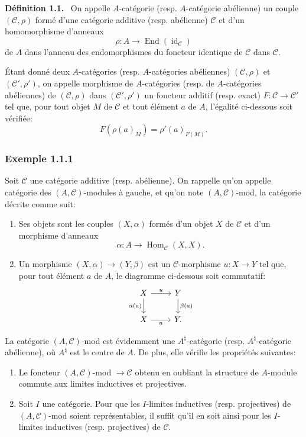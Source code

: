 \documentclass[11pt]{article}
\newenvironment{statement}[1]{\par\medskip\noindent\textbf{#1.}\ }{\par\medskip}
\DeclareMathOperator{\Hom}{Hom}
\providecommand{\id}{\operatorname{id}}
\providecommand{\Hom}{\operatorname{Hom}}
\providecommand{\cC}{\mathcal C}
\providecommand{\End}{\operatorname{End}}
\providecommand{\id}{\operatorname{id}}
\providecommand{\id}{\operatorname{id}}
\providecommand{\End}{\operatorname{End}}
\providecommand{\id}{\operatorname{id}}
\providecommand{\id}{\operatorname{id}}
\providecommand{\cC}{\mathcal C}
\providecommand{\Hom}{\operatorname{Hom}}
\providecommand{\id}{\operatorname{id}}
\begin{document}
\begin{statement}{Définition 1.1}
On appelle $A$-catégorie (resp. $A$-catégorie abélienne) un couple $(\cC,\rho)$ formé d'une catégorie additive (resp. abélienne) $\cC$ et d'un homomorphisme d'anneaux
\[
\rho:A\longrightarrow \End(\id_{\cC})
\]
de $A$ dans l'anneau des endomorphismes du foncteur identique de $\cC$ dans $\cC$.
\end{statement}

Étant donné deux $A$-catégories (resp. $A$-catégories abéliennes) $(\cC,\rho)$ et $(\cC',\rho')$, on appelle morphisme de $A$-catégories (resp. de $A$-catégories abéliennes) de $(\cC,\rho)$ dans $(\cC',\rho')$ un foncteur additif (resp. exact) $F:\cC\to\cC'$ tel que, pour tout objet $M$ de $\cC$ et tout élément $a$ de $A$, l'égalité ci-dessous soit vérifiée:
\[
F(\rho(a)_M)=\rho'(a)_{F(M)}.
\]

\subsubsection*{Exemple 1.1.1}
Soit $\cC$ une catégorie additive (resp. abélienne). On rappelle qu'on appelle catégorie des $(A,\cC)$-modules à gauche, et qu'on note $(A,\cC)$-mod, la catégorie décrite comme suit:
\begin{enumerate}[label=(\roman*)]
\item Ses objets sont les couples $(X,\alpha)$ formés d'un objet $X$ de $\cC$ et d'un morphisme d'anneaux
\[
\alpha:A\longrightarrow \Hom_{\cC}(X,X).
\]
\item Un morphisme $(X,\alpha)\to(Y,\beta)$ est un $\cC$-morphisme $u:X\to Y$ tel que, pour tout élément $a$ de $A$, le diagramme ci-dessous soit commutatif:
\[
\begin{tikzcd}
X \arrow[r,"u"] \arrow[d,"\alpha(a)"'] & Y \arrow[d,"\beta(a)"]\\
X \arrow[r,"u"'] & Y .
\end{tikzcd}
\]
\end{enumerate}
La catégorie $(A,\cC)$-mod est évidemment une $A^{\natural}$-catégorie (resp. $A^{\natural}$-catégorie abélienne), où $A^{\natural}$ est le centre de $A$. De plus, elle vérifie les propriétés suivantes:
\begin{enumerate}[label=(\alph*)]
\item Le foncteur $(A,\cC)$-mod $\to\cC$ obtenu en oubliant la structure de $A$-module commute aux limites inductives et projectives.
\item Soit $I$ une catégorie. Pour que les $I$-limites inductives (resp. projectives) de $(A,\cC)$-mod soient représentables, il suffit qu'il en soit ainsi pour les $I$-limites inductives (resp. projectives) de $\cC$.
\end{enumerate}
\end{document}
